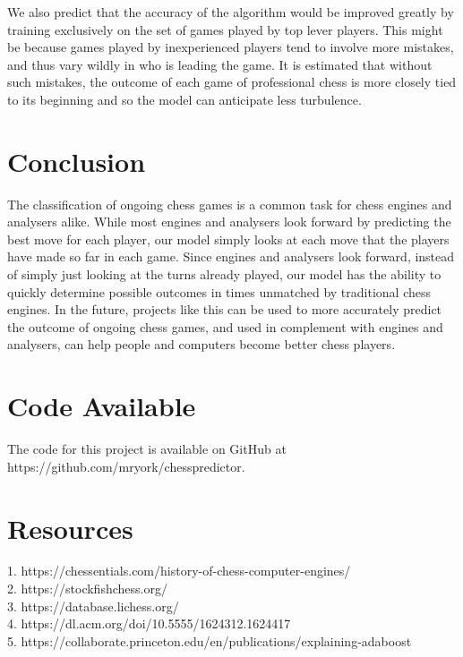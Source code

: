 \documentclass[]{interact}
\theoremstyle{plain}%
\theoremstyle{definition}
\theoremstyle{remark}
\begin{document}
We also predict that the accuracy of the algorithm would be improved greatly by training exclusively on the set of games played by top lever players. This might be because games played by inexperienced players tend to involve more mistakes, and thus vary wildly in who is leading the game. It is estimated that without such mistakes, the outcome of each game of professional chess is more closely tied to its beginning and so the model can anticipate less turbulence.

\section{Conclusion}
The classification of ongoing chess games is a common task for chess engines and analysers alike. While most engines and analysers look forward by predicting the best move for each player, our model simply looks at each move that the players have made so far in each game. Since engines and analysers look forward, instead of simply just looking at the turns already played, our model has the ability to quickly determine possible outcomes in times unmatched by traditional chess engines. In the future, projects like this can be used to more accurately predict the outcome of ongoing chess games, and used in complement with engines and analysers, can help people and computers become better chess players.

\section{Code Available}
The code for this project is available on GitHub at https://github.com/mryork/chesspredictor.

\section{Resources}
1. https://chessentials.com/history-of-chess-computer-engines/ \\
2. https://stockfishchess.org/ \\
3. https://database.lichess.org/ \\
4. https://dl.acm.org/doi/10.5555/1624312.1624417 \\
5. https://collaborate.princeton.edu/en/publications/explaining-adaboost
\end{document}
